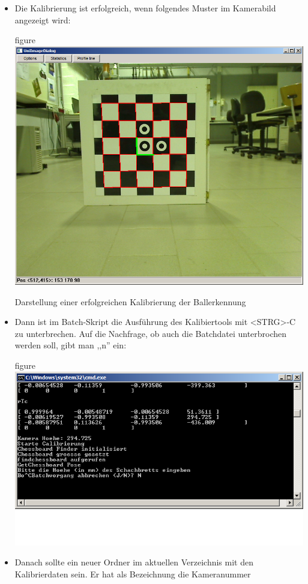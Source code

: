 \begin{itemize}
\begin{nofloat}{figure}
    \caption{Abfrage der zur Kalibrierung nötigen Parameter}
  \end{nofloat}\newpage
\item Die Kalibrierung ist erfolgreich, wenn folgendes Muster im
  Kamerabild angezeigt wird:
  \begin{nofloat}{figure}\centering
    \includegraphics[width=0.7\linewidth]{bilder/calibrate2}
    \caption{Darstellung einer erfolgreichen Kalibrierung der Ballerkennung}
  \end{nofloat}
\item Dann ist im Batch-Skript die Ausführung
  des Kalibiertools mit <STRG>-C zu unterbrechen. Auf die Nachfrage,
  ob auch die Batchdatei unterbrochen werden soll, gibt man ,,n'' ein:
 \begin{nofloat}{figure}\centering
    \includegraphics[width=\linewidth]{bilder/calibrate3}
  \end{nofloat}\newpage
\item Danach sollte ein neuer Ordner im aktuellen Verzeichnis mit den
  Kalibrierdaten sein. Er hat als Bezeichnung die Kameranummer

\end{itemize}

